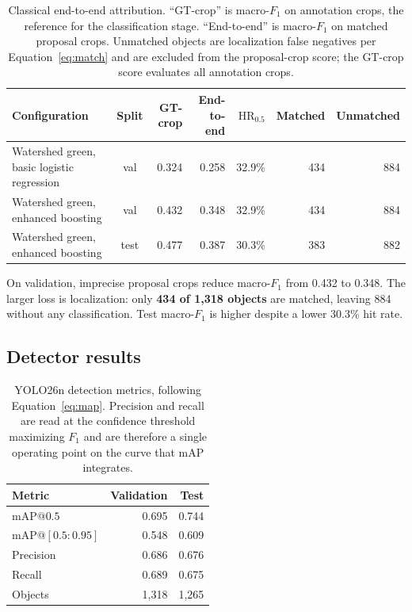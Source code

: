 \documentclass[a4paper,8pt]{article}
\begin{document}
\begin{table}[H]
\centering
\small
\renewcommand{\arraystretch}{1.2}
\begin{tabularx}{\textwidth}{|>{\raggedright\arraybackslash}X|c|r|r|r|r|r|}
\hline
\textbf{Configuration} & \textbf{Split} & \textbf{GT-crop} & \textbf{End-to-end} & \textbf{$\mathrm{HR}_{0.5}$} & \textbf{Matched} & \textbf{Unmatched}\\
\hline
Watershed green, basic logistic regression & val & 0.324 & 0.258 & 32.9\% & 434 & 884\\
\hline
Watershed green, enhanced boosting & val & 0.432 & 0.348 & 32.9\% & 434 & 884\\
\hline
Watershed green, enhanced boosting & test & 0.477 & 0.387 & 30.3\% & 383 & 882\\
\hline
\end{tabularx}
\caption{Classical end-to-end attribution. ``GT-crop'' is macro-$F_1$ on annotation crops, the
reference for the classification stage. ``End-to-end'' is macro-$F_1$ on matched proposal crops.
Unmatched objects are localization false negatives per Equation~\eqref{eq:match} and are
excluded from the proposal-crop score; the GT-crop score evaluates all annotation crops.}
\label{tab:e2e}
\end{table}

On validation, imprecise proposal crops reduce macro-$F_1$ from 0.432 to 0.348. The larger loss is
localization: only \textbf{434 of 1,318 objects} are matched, leaving 884 without any
classification. Test macro-$F_1$ is higher despite a lower 30.3\% hit rate.

\subsection{Detector results}
\label{sec:yolo-results}

\begin{table}[H]
\centering
\small
\renewcommand{\arraystretch}{1.2}
\begin{tabularx}{0.9\textwidth}{|>{\raggedright\arraybackslash}X|r|r|}
\hline
\textbf{Metric} & \textbf{Validation} & \textbf{Test}\\
\hline
$\mathrm{mAP}@0.5$ & 0.695 & 0.744\\
\hline
$\mathrm{mAP}@[0.5{:}0.95]$ & 0.548 & 0.609\\
\hline
Precision & 0.686 & 0.676\\
\hline
Recall & 0.689 & 0.675\\
\hline
Objects & 1{,}318 & 1{,}265\\
\hline
\end{tabularx}
\caption{YOLO26n detection metrics, following Equation~\eqref{eq:map}. Precision and recall are
read at the confidence threshold maximizing $F_1$ and are therefore a single operating point on
the curve that mAP integrates.}
\label{tab:yolo-detection}
\end{table}
\end{document}

